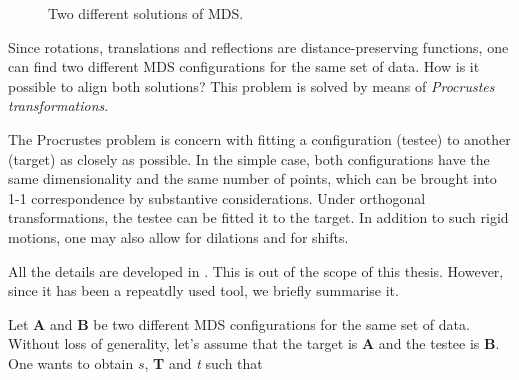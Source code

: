 \documentclass[11pt]{report}
\begin{document}
\begin{figure}[ht]
    \centering
    \qquad
    \caption{Two different solutions of MDS.}%
    \label{twosol}%
\end{figure}


\indent Since rotations, translations and reflections are distance-preserving 
functions, one can find two different MDS configurations 
for the same set of data. How is it possible to align both solutions? This 
problem is solved by means of \textit{Procrustes transformations}.  


\indent The Procrustes problem is concern with fitting a configuration (testee)
to another (target) as closely as possible. In the simple case, both 
configurations have the same dimensionality and the same number of points, which
can be brought into 1-1 correspondence by substantive considerations. Under
orthogonal transformations, the testee can be fitted it to the target. In 
addition to such rigid motions, one may also allow for dilations and for shifts.

\indent All the details are developed in  \cite{BorgGroenen2005}. This is out 
of the scope of this thesis. However, since it has been a repeatdly used tool, 
we briefly summarise it. 

\indent Let \textbf{A} and \textbf{B} be two different MDS configurations for
the same set of data. Without loss of generality, let's assume that the target 
is \textbf{A} and the testee is \textbf{B}. One wants to obtain $s$, \textbf{T}
and \textit{t} such that
\end{document}
